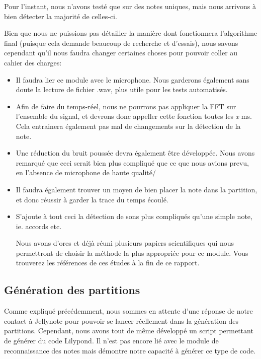 \documentclass[12pt]{article}
\begin{document}
\par Pour l'instant, nous n'avons testé que sur des notes uniques, mais nous arrivons à bien détecter la majorité de celles-ci.\\

\par Bien que nous ne puissions pas détailler la manière dont fonctionnera l'algorithme final (puisque cela demande beaucoup de recherche et d'essais), nous savons cependant qu'il nous faudra changer certaines choses pour pouvoir coller au cahier des charges:
\begin{itemize}

\item Il faudra lier ce module avec le microphone. Nous garderons également sans doute la lecture de fichier .wav, plus utile pour les tests automatisés.
\item Afin de faire du temps-réel, nous ne pourrons pas appliquer la FFT sur l'ensemble du signal, et devrons donc appeller cette fonction toutes les \emph{x} ms. Cela entrainera également pas mal de changements sur la détection de la note.
\item Une réduction du bruit poussée devra également être développée. Nous avons remarqué que ceci serait bien plus compliqué que ce que nous avions prevu, en l'absence de microphone de haute qualité/
\item Il faudra également trouver un moyen de bien placer la note dans la partition, et donc réussir à garder la trace du temps écoulé.
\item S'ajoute à tout ceci la détection de sons plus compliqués qu'une simple note, ie. accords etc.

\par Nous avons d'ores et déjà réuni plusieurs papiers scientifiques qui nous permettront de choisir la méthode la plus appropriée pour ce module. Vous trouverez les références de ces études à la fin de ce rapport.

\end{itemize}

\subsection{Génération des partitions}

\par Comme expliqué précédemment, nous sommes en attente d'une réponse de notre contact à Jellynote pour pouvoir se lancer réellement dans la génération des partitions. Cependant, nous avons tout de même développé un script permettant de générer du code Lilypond. Il n'est pas encore lié avec le module de reconnaissance des notes mais démontre notre capacité à générer ce type de code.
\end{document}
